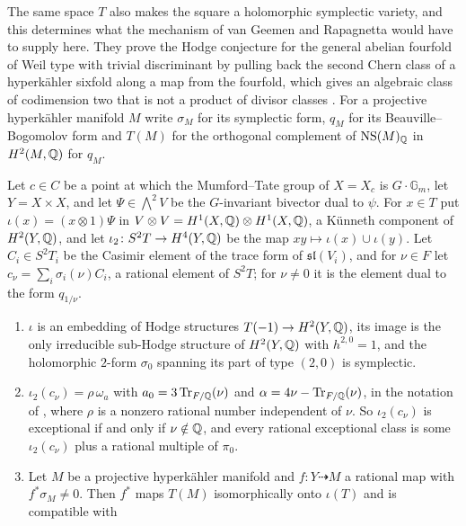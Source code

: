 The same space $T$ also makes the square a holomorphic symplectic variety,
and this determines what the mechanism of van Geemen and Rapagnetta would
have to supply here. They prove the Hodge conjecture for the general abelian
fourfold of Weil type with trivial discriminant by pulling back the second
Chern class of a hyperk\"ahler sixfold along a map from the fourfold, which
gives an algebraic class of codimension two that is not a product of divisor
classes \cite{vGR26}. For a projective hyperk\"ahler manifold $M$ write
$\sigma_{M}$ for its symplectic form, $q_{M}$ for its Beauville--Bogomolov
form and $T(M)$ for the orthogonal complement of $\mathrm{NS}(M)_{\mathbb{Q}}$ in
$H^{2}(M,\mathbb{Q})$ for $q_{M}$.

\begin{proposition}\label{prop:hksquare}
Let $c\in C$ be a point at which the Mumford--Tate group of $X=X_{c}$ is
$G\cdot\mathbb{G}_{m}$, let $Y=X\times X$, and let $\Psi\in\bigwedge^{2}V$ be
the $G$-invariant bivector dual to $\psi$. For $x\in T$ put
$\iota(x)=(x\otimes1)\Psi$ in $V\otimes V=H^{1}(X,\mathbb{Q})\otimes H^{1}(X,\mathbb{Q})$, a
K\"unneth component of $H^{2}(Y,\mathbb{Q})$, and let $\iota_{2}\colon S^{2}T\to
H^{4}(Y,\mathbb{Q})$ be the map $xy\mapsto\iota(x)\cup\iota(y)$. Let $C_{i}\in
S^{2}T_{i}$ be the Casimir element of the trace form of
$\mathfrak{sl}(V_{i})$, and for $\nu\in F$ let
$c_{\nu}=\sum_{i}\sigma_{i}(\nu)C_{i}$, a rational element of $S^{2}T$; for
$\nu\ne0$ it is the element dual to the form $q_{1/\nu}$.
\begin{enumerate}[label=\textup{(\roman*)},leftmargin=2.6em,itemsep=2pt]
\item $\iota$ is an embedding of Hodge structures $T(-1)\to H^{2}(Y,\mathbb{Q})$, its
  image is the only irreducible sub-Hodge structure of $H^{2}(Y,\mathbb{Q})$ with
  $h^{2,0}=1$, and the holomorphic $2$-form $\sigma_{0}$ spanning its part of
  type $(2,0)$ is symplectic.
\item $\iota_{2}(c_{\nu})=\rho\,\omega_{a}$ with $a_{0}=3\operatorname{Tr}_{F/\mathbb{Q}}(\nu)$ and
  $\alpha=4\nu-\operatorname{Tr}_{F/\mathbb{Q}}(\nu)$, in the notation of ,
  where $\rho$ is a nonzero rational number independent of $\nu$. So
  $\iota_{2}(c_{\nu})$ is exceptional if and only if $\nu\notin\mathbb{Q}$, and every
  rational exceptional class is some $\iota_{2}(c_{\nu})$ plus a rational
  multiple of $\pi_{0}$.
\item Let $M$ be a projective hyperk\"ahler manifold and
  $f\colon Y\dashrightarrow M$ a rational map with $f^{*}\sigma_{M}\ne0$. Then
  $f^{*}$ maps $T(M)$ isomorphically onto $\iota(T)$ and is compatible with

\end{enumerate}
\end{proposition}
